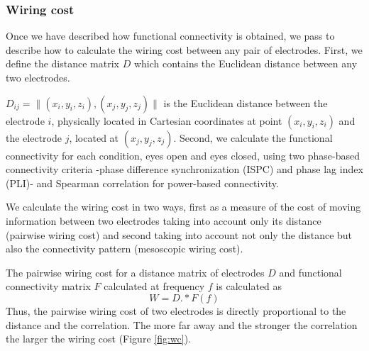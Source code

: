 \documentclass[11pt, onecolumn]{article}
\begin{document}
\subsubsection{Wiring cost}
Once we have described how functional connectivity is obtained, we pass to describe how to calculate the wiring cost between any pair of electrodes.
First, we define the distance matrix $D$ which contains the Euclidean distance between any two electrodes. 

$D_{ij} = \Big\|(x_i,y_i,z_i),(x_j,y_j,z_j) \Big\|$ is the Euclidean distance between the electrode $i$, physically located in Cartesian coordinates at point $(x_i,y_i,z_i)$ and the electrode $j$, located at $(x_j,y_j,z_j)$.
Second, we calculate the functional connectivity for each condition, eyes open and eyes closed, using two phase-based connectivity criteria -phase difference synchronization (ISPC) and phase lag index (PLI)- and Spearman correlation for power-based connectivity. %

We calculate the  wiring cost in two ways, first as a measure of the cost of moving information between two electrodes taking into account only its distance (pairwise wiring cost) and second taking into account not only the distance but also the connectivity pattern (mesoscopic wiring cost).

The pairwise wiring cost for a distance matrix of electrodes $D$ and functional connectivity matrix $F$ calculated at frequency $f$ is calculated as
\begin{equation}
W = D.*F(f)
\label{eq:pairwc}
\end{equation} 
Thus, the pairwise wiring cost of two electrodes is directly proportional to the distance and the correlation. The more far away and the stronger the correlation the larger the wiring cost (Figure \ref{fig:wc}). 
\end{document}
